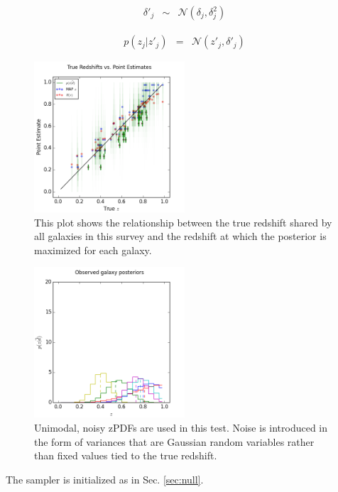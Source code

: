 \documentclass[preprint]{aastex}
\begin{document}
\begin{eqnarray}
\label{eq:znoise-how}
\delta'_{j} &\sim& \mathcal{N}(\delta_{j},\delta^{2}_{j})
\end{eqnarray}

\begin{eqnarray}
\label{eq:znoise}
p(z_{j}|z'_{j}) &=& \mathcal{N}(z'_{j},\delta'_{j})
\end{eqnarray}

\begin{figure}
\includegraphics[width=0.5\textwidth]{sigma/truevmap.png}
\caption{This plot shows the relationship between the true redshift shared by all galaxies in this survey and the redshift at which the posterior is maximized for each galaxy.}
\label{fig:noisycat}
\end{figure}

\begin{figure}
\includegraphics[width=0.5\textwidth]{sigma/samplepzs.png}
\caption{Unimodal, noisy zPDFs are used in this test.  Noise is introduced in the form of variances that are Gaussian random variables rather than fixed values tied to the true redshift.}
\label{fig:noisypzs}
\end{figure}

The sampler is initialized as in Sec. \ref{sec:null}.
\end{document}
